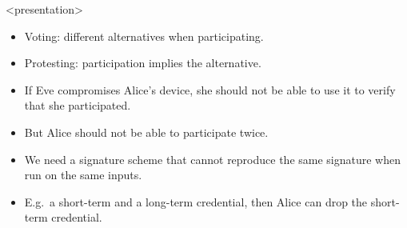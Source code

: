 \begin{frame}<presentation>
  \begin{remark}
    \begin{itemize}
      \item Voting: different alternatives when participating.
      \item Protesting: participation implies the alternative.
    \end{itemize}
  \end{remark}

  \pause

  \begin{idea}
    \begin{itemize}
      \item If Eve compromises Alice's device, she should not be able to use 
        it to verify that she participated.

      \item But Alice should not be able to participate twice.

      \item We need a signature scheme that cannot reproduce the same 
        signature when run on the same inputs.

        \item E.g.\ a short-term and a long-term credential, then Alice can 
          drop the short-term credential.
    \end{itemize}
  \end{idea}
\end{frame}

